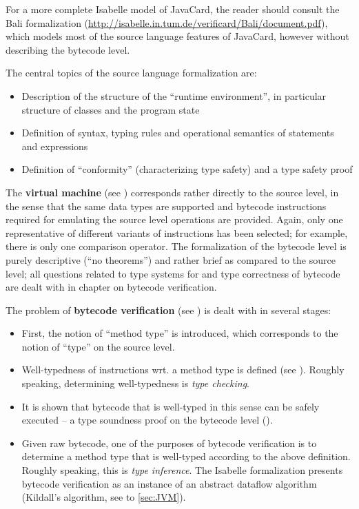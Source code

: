 For a more complete Isabelle model of JavaCard, the reader should
consult the Bali formalization
(\url{http://isabelle.in.tum.de/verificard/Bali/document.pdf}), which
models most of the source language features of JavaCard, however without
describing the bytecode level.

The central topics of the source language formalization are:
\begin{itemize}
\item Description of the structure of the ``runtime environment'', in
  particular structure of classes and the program state
\item Definition of syntax, typing rules and operational semantics of
  statements and expressions
\item Definition of ``conformity'' (characterizing type safety) and a
  type safety proof
\end{itemize}


The \mJava{} \textbf{virtual machine} (see )
corresponds rather directly to the source level, in the sense that the
same data types are supported and bytecode instructions required for
emulating the source level operations are provided. Again, only one
representative of different variants of instructions has been
selected; for example, there is only one comparison operator.  The
formalization of the bytecode level is purely descriptive (``no
theorems'') and rather brief as compared to the source level; all
questions related to type systems for and type correctness of bytecode
are dealt with in chapter on bytecode verification.

The problem of \textbf{bytecode verification} (see ) is
dealt with in several stages:
\begin{itemize}
\item First, the notion of ``method type'' is introduced, which
  corresponds to the notion of ``type'' on the source level.
\item Well-typedness of instructions wrt. a method type is defined
  (see ). Roughly speaking, determining
  well-typedness is \emph{type checking}.
\item It is shown that bytecode that is well-typed in this sense can
  be safely executed -- a type soundness proof on the bytecode level
  (). 
\item Given raw bytecode, one of the purposes of bytecode verification
  is to determine a method type that is well-typed according to the
  above definition. Roughly speaking, this is \emph{type inference}.
  The Isabelle formalization presents bytecode verification as an
  instance of an abstract dataflow algorithm (Kildall's algorithm, see
   to \ref{sec:JVM}).
\end{itemize}

